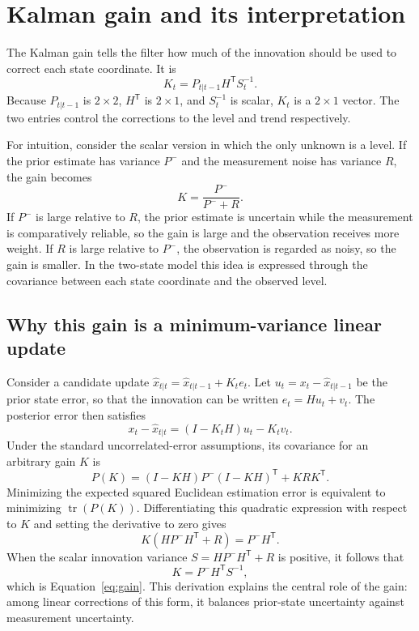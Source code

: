 \documentclass[12pt,a4paper,oneside]{report}
\numberwithin{equation}{chapter}
\numberwithin{figure}{chapter}
\numberwithin{table}{chapter}
\theoremstyle{definition}
\theoremstyle{plain}
\DeclareMathOperator{\tr}{tr}
\newcommand{\1}{\mathbf{1}}
\newcommand{\trans}{^{\mathsf T}}
\newcommand{\hatt}[1]{\widehat{#1}}
\begin{document}
\section{Kalman gain and its interpretation}
The Kalman gain tells the filter how much of the innovation should be used to correct each state coordinate. It is
\begin{equation}
  K_t=P_{t|t-1}H\trans S_t^{-1}.
  \label{eq:gain}
\end{equation}
Because $P_{t|t-1}$ is $2\times2$, $H\trans$ is $2\times1$, and $S_t^{-1}$ is scalar, $K_t$ is a $2\times1$ vector. The two entries control the corrections to the level and trend respectively.

For intuition, consider the scalar version in which the only unknown is a level. If the prior estimate has variance $P^-$ and the measurement noise has variance $R$, the gain becomes
\[
  K=\frac{P^-}{P^-+R}.
\]
If $P^-$ is large relative to $R$, the prior estimate is uncertain while the measurement is comparatively reliable, so the gain is large and the observation receives more weight. If $R$ is large relative to $P^-$, the observation is regarded as noisy, so the gain is smaller. In the two-state model this idea is expressed through the covariance between each state coordinate and the observed level.

\subsection{Why this gain is a minimum-variance linear update}
Consider a candidate update $\hatt{x}_{t|t}=\hatt{x}_{t|t-1}+K_te_t$. Let $u_t=x_t-\hatt{x}_{t|t-1}$ be the prior state error, so that the innovation can be written $e_t=Hu_t+v_t$. The posterior error then satisfies
\[
  x_t-\hatt{x}_{t|t}=(I-K_tH)u_t-K_tv_t.
\]
Under the standard uncorrelated-error assumptions, its covariance for an arbitrary gain $K$ is
\begin{equation}
  P(K)=(I-KH)P^-(I-KH)\trans+KRK\trans.
  \label{eq:joseph}
\end{equation}
Minimizing the expected squared Euclidean estimation error is equivalent to minimizing $\tr(P(K))$. Differentiating this quadratic expression with respect to $K$ and setting the derivative to zero gives
\[
  K(HP^-H\trans+R)=P^-H\trans.
\]
When the scalar innovation variance $S=HP^-H\trans+R$ is positive, it follows that
\[
  K=P^-H\trans S^{-1},
\]
which is Equation~\eqref{eq:gain}. This derivation explains the central role of the gain: among linear corrections of this form, it balances prior-state uncertainty against measurement uncertainty.
\end{document}
